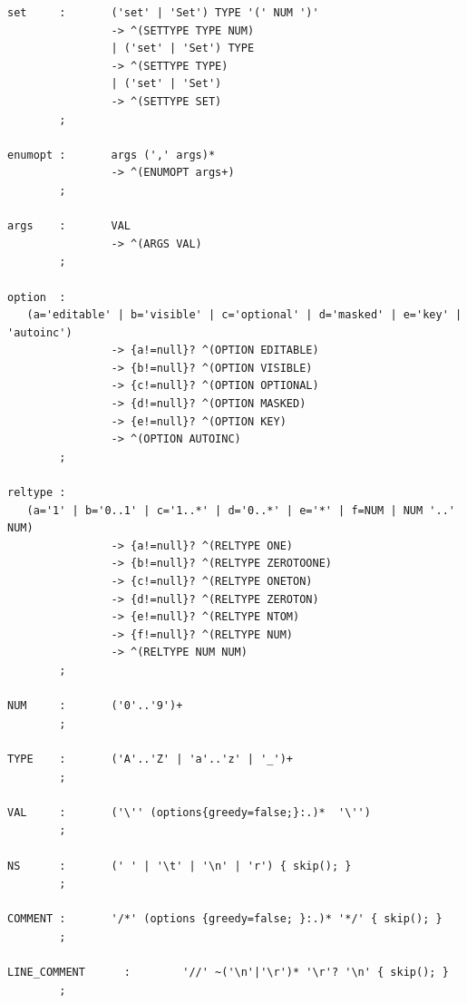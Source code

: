 \documentclass[a4paper]{article}
\begin{document}
\begin{appendix}
\begin{small}
\begin{lstlisting}
set     :       ('set' | 'Set') TYPE '(' NUM ')'
                -> ^(SETTYPE TYPE NUM)
                | ('set' | 'Set') TYPE
                -> ^(SETTYPE TYPE)
                | ('set' | 'Set')
                -> ^(SETTYPE SET)
        ;

enumopt :       args (',' args)*
                -> ^(ENUMOPT args+)
        ;

args    :       VAL
                -> ^(ARGS VAL)
        ;

option  :
   (a='editable' | b='visible' | c='optional' | d='masked' | e='key' | 'autoinc')
                -> {a!=null}? ^(OPTION EDITABLE)
                -> {b!=null}? ^(OPTION VISIBLE)
                -> {c!=null}? ^(OPTION OPTIONAL)
                -> {d!=null}? ^(OPTION MASKED)
                -> {e!=null}? ^(OPTION KEY)
                -> ^(OPTION AUTOINC)
        ;

reltype :
   (a='1' | b='0..1' | c='1..*' | d='0..*' | e='*' | f=NUM | NUM '..' NUM)
                -> {a!=null}? ^(RELTYPE ONE)
                -> {b!=null}? ^(RELTYPE ZEROTOONE)
                -> {c!=null}? ^(RELTYPE ONETON)
                -> {d!=null}? ^(RELTYPE ZEROTON)
                -> {e!=null}? ^(RELTYPE NTOM)
                -> {f!=null}? ^(RELTYPE NUM)
                -> ^(RELTYPE NUM NUM)
        ;

NUM     :       ('0'..'9')+
        ;

TYPE    :       ('A'..'Z' | 'a'..'z' | '_')+
        ;

VAL     :       ('\'' (options{greedy=false;}:.)*  '\'')
        ;

NS      :       (' ' | '\t' | '\n' | 'r') { skip(); }
        ;

COMMENT :       '/*' (options {greedy=false; }:.)* '*/' { skip(); }
        ;

LINE_COMMENT      :        '//' ~('\n'|'\r')* '\r'? '\n' { skip(); }
        ;
\end{lstlisting}
\end{small}

\newpage


\end{appendix}
\end{document}
